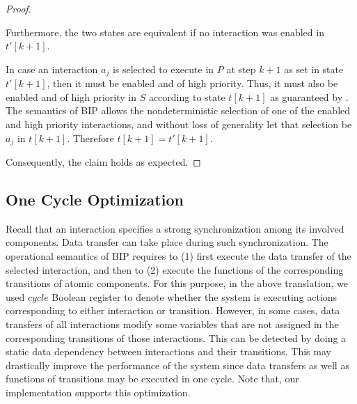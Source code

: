 \begin{proof}
\begin{itemize}
Furthermore, the two states are equivalent if no interaction 
was enabled in $t'[k+1]$. 

In case an interaction $a_j$ is selected to execute in $P$ 
at step $k+1$ as set in state $t'[k+1]$, 
then it must be enabled and of high priority.
Thus, it must also be enabled and of high priority in $S$ 
according to state $t[k+1]$
as guaranteed by . 
The semantics of BIP allows the nondeterministic selection of
one of the enabled and high priority interactions, 
and without loss of generality let that selection 
be $a_j$ in $t[k+1]$. 
Therefore $t[k+1]=t'[k+1]$. 
\end{itemize}
%
Consequently, the claim holds as expected. 
\end{proof}
%
\subsection{One Cycle Optimization}
%
Recall that an interaction specifies a strong synchronization among its involved components.
Data transfer can take place during such synchronization.
The operational semantics of BIP requires to (1) first execute the data transfer of the selected interaction, and then to (2) execute the functions of the corresponding transitions of atomic components.
For this purpose, in the above translation, we used $\mathit{cycle}$ Boolean register to denote whether the system is executing actions corresponding to either interaction or transition.
However, in some cases, data transfers of all interactions modify some variables that are not assigned in the corresponding transitions of those interactions.
This can be detected by doing a static data dependency between interactions and their transitions. 
This may drastically improve the performance of the system since data transfers as well as functions of transitions may be executed in one cycle. Note that, our implementation supports this optimization. 
%
